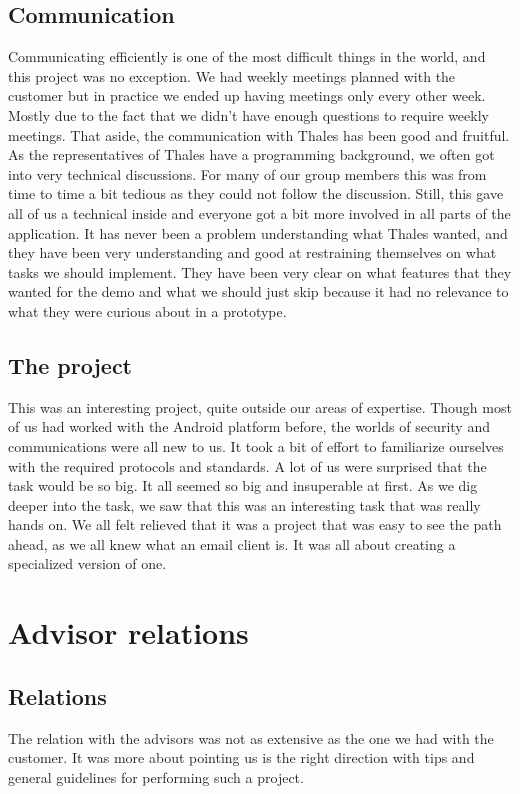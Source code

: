 \subsection{Communication}
Communicating efficiently is one of the most difficult things in the world, and this project was no exception. We had weekly meetings planned with the customer but in practice we ended up having meetings only every other week. Mostly due to the fact that we didn’t have enough questions to require weekly meetings.
\newline
\newline
That aside, the communication with Thales has been good and fruitful. As the representatives of Thales have a programming background, we often got into very technical discussions. For many of our group members this was from time to time a bit tedious as they could not follow the discussion. Still, this gave all of us a technical inside and everyone got a bit more involved in all parts of the application. It has never been a problem understanding what Thales wanted, and they have been very understanding and good at restraining themselves on what tasks we should implement. They have been very clear on what features that they wanted for the demo and what we should just skip because it had no relevance to what they were curious about in a prototype.
\subsection{The project}
This was an interesting project, quite outside our areas of expertise. Though most of us had worked with the Android platform before, the worlds of security and communications were all new to us. It took a bit of effort to familiarize ourselves with the required protocols and standards.
A lot of us were surprised that the task would be so big. It all seemed so big and insuperable at first. As we dig deeper into the task, we saw that this was an interesting task that was really hands on. We all felt relieved that it was a project that was easy to see the path ahead, as we all knew what an email client is. It was all about creating a specialized version of one. 

\section{Advisor relations}\label{sec:refl_advisor}

\subsection{Relations}
The relation with the advisors was not as extensive as the one we had with the customer. It was more about pointing us is the right direction with tips and general guidelines for performing such a project. 


